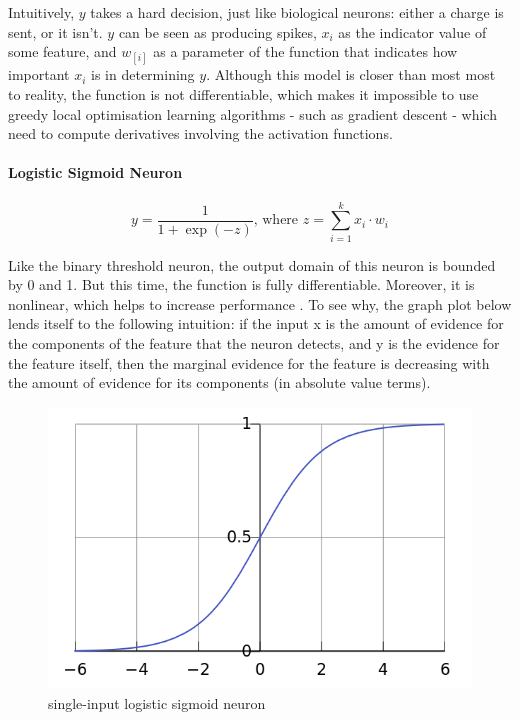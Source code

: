 \documentclass[a4paper,11pt]{article}
\begin{document}
Intuitively, $y$ takes a hard decision, just like biological neurons: either a charge is sent, or it isn't. $y$ can be seen as producing spikes, $x_{i}$ as the indicator value of some feature, and $w_[i]$ as a parameter of the function that indicates how important $x_{i}$ is in determining $y$. Although this model is closer than most most to reality, the function is not differentiable, which makes it impossible to use greedy local optimisation learning algorithms - such as gradient descent - which need to compute derivatives involving the activation functions.

\paragraph{Logistic Sigmoid Neuron} 
\begin{equation}
\label{sigmoid neuron}
y = \frac{1}{1 + \exp(-z)} \text{, where } z = \sum\limits_{i=1}^k x_{i}\cdot w_{i}
\end{equation}

Like the binary threshold neuron, the output domain of this neuron is bounded by 0 and 1. But this time, the function is fully differentiable. Moreover, it is nonlinear, which helps to increase performance \cite{DL-book}. To see why, the graph plot below lends itself to the following intuition: if the input x is the amount of evidence for the components of the feature that the neuron detects, and y is the evidence for the feature itself, then the marginal evidence for the feature is decreasing with the amount of evidence for its components (in absolute value terms). 

\begin{figure}[h!]
	\centering
	\includegraphics[scale=0.3]{images/sigmoid.png}
	\caption{single-input logistic sigmoid neuron}
\end{figure}
\end{document}
